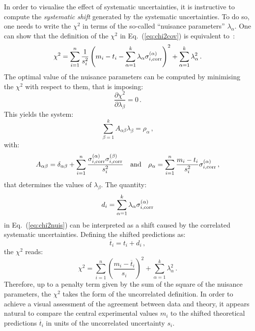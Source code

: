 \documentclass[10pt,a4paper]{article}
\begin{document}
In order to visualise the effect of systematic uncertainties, it is
instructive to compute the \textit{systematic shift} generated by the
systematic uncertainties. To do so, one needs to write the $\chi^2$ in
terms of the so-called ``nuisance parameters'' $\lambda_\alpha$. One
can show that the definition of the $\chi^2$ in Eq.~(\ref{eq:chi2cov})
is equivalent to~\cite{Ball:2012wy}:
\begin{equation}\label{eq:chi2nuis}
\chi^2 = \sum_{i=1}^n\frac{1}{s_i^2}\left(m_i -t_i
  -\sum_{\alpha=1}^k\lambda_\alpha \sigma_{i,\rm corr}^{(\alpha)} \right)^2 + \sum_{\alpha=1}^k\lambda_\alpha^2\,.
\end{equation}
The optimal value of the nuisance parameters can be computed by
minimising the $\chi^2$ with respect to them, that is imposing:
\begin{equation}
\frac{\partial \chi^2}{\partial \lambda_\beta} = 0\,.
\end{equation}
This yields the system:
\begin{equation}\label{eq:nuissys}
  \sum_{\beta=1}^kA_{\alpha\beta}\lambda_\beta =\rho_\alpha\,,
\end{equation}
with:
\begin{equation}\label{eq:sysing}
A_{\alpha\beta}= \delta_{\alpha\beta}+\sum_{i=1}^n\frac{\sigma_{i,\rm corr}^{(\alpha)}\sigma_{i,\rm corr}^{(\beta)}}{s_i^2}\quad\mbox{and}\quad \rho_\alpha=\sum_{i=1}^n\frac{m_i-t_i}{s_i^2}\sigma_{i,\rm corr}^{(\alpha)}\,,
\end{equation}
that determines the values of $\lambda_\beta$. The quantity:
\begin{equation}
d_i =\sum_{\alpha=1}^k\lambda_\alpha \sigma_{i,\rm corr}^{(\alpha)}
\end{equation}
in Eq.~(\ref{eq:chi2nuis}) can be interpreted as a shift caused by the
correlated systematic uncertainties. Defining the shifted predictions
as:
\begin{equation}
\overline{t}_i =t_i+d_i\,,
\end{equation}
the $\chi^2$ reads:
\begin{equation}\label{eq:chi2nuisshift}
  \chi^2 = \sum_{i=1}^n\left(\frac{m_i -\overline{t}_i}{s_i}\right)^2 + \sum_{\alpha=1}^k\lambda_\alpha^2\,.
\end{equation}
Therefore, up to a penalty term given by the sum of the square of the
nuisance parameters, the $\chi^2$ takes the form of the uncorrelated
definition. In order to achieve a visual assessment of the agreement
between data and theory, it appears natural to compare the central
experimental values $m_i$ to the shifted theoretical predictions
$\overline{t}_i$ in units of the uncorrelated uncertainty $s_i$.
\end{document}
